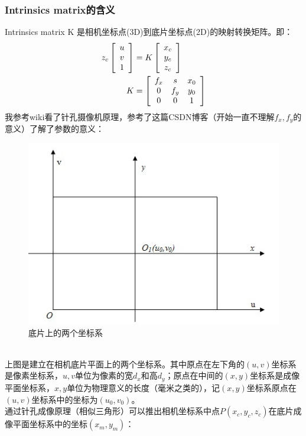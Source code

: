 \documentclass[UTF8]{ctexart}
\begin{document}
\subsubsection{Intrinsics matrix的含义}
Intrinsics matrix K 是相机坐标点(3D)到底片坐标点(2D)的映射转换矩阵。即：
\begin{align}
 z_c \left[ \begin{array}{c}  u \\ v \\ 1 \end{array} \right] &=
 K \left[ \begin{array}{c}   x_c \\  y_c \\  z_c  \end{array}\right]\\
K &= \left [ \begin{array}{ c c c}
f_x & s   & x_0 \\
0  & f_y & y_0 \\
0  & 0   & 1 \\
\end{array} \right ]
\end{align}
我参考wiki\cite{Pinholecameramodel18830}看了针孔摄像机原理，参考了这篇CSDN博客\cite{CSDNJessicajiel18830}（开始一直不理解$f_x,f_y$的意义）了解了参数的意义：
\begin{figure}[htp]%
	\centering  %
	\includegraphics[width=0.5\linewidth]{./figures/twocor.jpg} %
	\caption{底片上的两个坐标系}  %
	\label{fig:calibration_coordinate_blocks}   %
\end{figure}\\
上图是建立在相机底片平面上的两个坐标系。其中原点在左下角的$(u,v)$坐标系是像素坐标系，$u,v$单位为像素的宽$d_x$和高$d_y$；原点在中间的$(x,y)$坐标系是成像平面坐标系，$x,y$单位为物理意义的长度（毫米之类的），记$(x,y)$坐标系原点在$(u,v)$坐标系中的坐标为$(u_0,v_0)$。\\
通过\cite{Pinholecameramodel18830}针孔成像原理（相似三角形）可以推出相机坐标系中点$P(x_c,y_c,z_c)$在底片成像平面坐标系中的坐标$(x_m,y_m)$：
\end{document}
